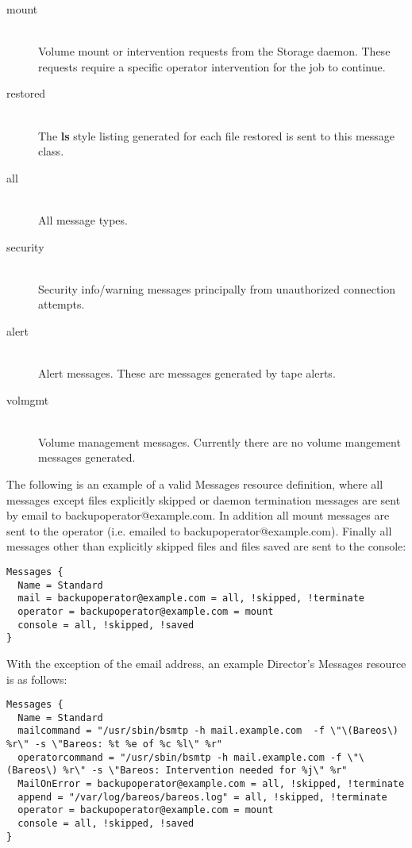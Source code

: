\begin{description}
\begin{description}
\item [mount] \hfill \\
Volume mount or intervention requests from the Storage daemon.  These
requests require a specific operator intervention for the job to
continue.

\item [restored] \hfill \\
The {\bf ls} style listing generated for each file restored is sent to
this message class.

\item [all] \hfill \\
All message types.

\item [security] \hfill \\
Security info/warning messages principally from unauthorized
connection attempts.

\item [alert] \hfill \\
Alert messages. These are messages generated by tape alerts.

\item [volmgmt] \hfill \\
Volume management messages. Currently there are no volume mangement
messages generated.
\end{description}

\end{description}

The following is an example of a valid Messages resource definition, where
all messages except files explicitly skipped or daemon termination messages
are sent by email to backupoperator@example.com.  In addition all mount messages
are sent to the operator (i.e.  emailed to backupoperator@example.com).  Finally
all messages other than explicitly skipped files and files saved are sent
to the console:

\footnotesize
\begin{verbatim}
Messages {
  Name = Standard
  mail = backupoperator@example.com = all, !skipped, !terminate
  operator = backupoperator@example.com = mount
  console = all, !skipped, !saved
}
\end{verbatim}
\normalsize

With the exception of the email address,
an example Director's Messages resource is as follows:

\footnotesize
\begin{verbatim}
Messages {
  Name = Standard
  mailcommand = "/usr/sbin/bsmtp -h mail.example.com  -f \"\(Bareos\) %r\" -s \"Bareos: %t %e of %c %l\" %r"
  operatorcommand = "/usr/sbin/bsmtp -h mail.example.com -f \"\(Bareos\) %r\" -s \"Bareos: Intervention needed for %j\" %r"
  MailOnError = backupoperator@example.com = all, !skipped, !terminate
  append = "/var/log/bareos/bareos.log" = all, !skipped, !terminate
  operator = backupoperator@example.com = mount
  console = all, !skipped, !saved
}
\end{verbatim}
\normalsize
